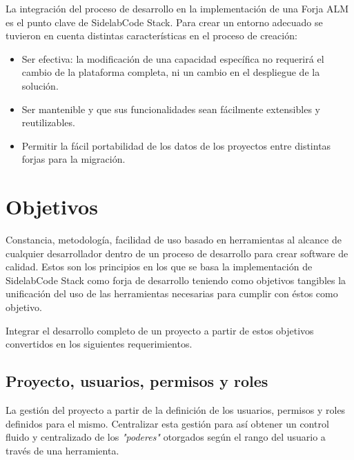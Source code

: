 \par La integraci\'on del proceso de desarrollo en la implementaci\'on de una Forja ALM es el punto clave de SidelabCode Stack. Para crear un entorno adecuado se tuvieron en cuenta distintas características en el proceso de creación:

\begin{itemize}
	\item Ser efectiva: la modificaci\'on de una capacidad espec\'ifica no requerir\'a el cambio de la plataforma completa, ni un cambio en el despliegue de la soluci\'on.
	\item Ser mantenible y que sus funcionalidades sean f\'acilmente extensibles y reutilizables.
	\item Permitir la f\'acil portabilidad de los datos de los proyectos entre distintas forjas para la migración.
\end{itemize}


\chapter{Objetivos}
\label{chap:objetivos}

\par Constancia, metodolog\'ia, facilidad de uso basado en herramientas al alcance de cualquier desarrollador dentro de un proceso de desarrollo para crear software de calidad. Estos son los principios en los que se basa la implementación de SidelabCode Stack como forja de desarrollo teniendo como objetivos tangibles la unificación del uso de las herramientas necesarias para cumplir con éstos como objetivo.

\par Integrar el desarrollo completo de un proyecto a partir de estos objetivos convertidos en los siguientes requerimientos.

\section{Proyecto, usuarios, permisos y roles }
\label{sec:proyecto-usuarios}

\par La gestión del proyecto a partir de la definición de los usuarios, permisos y roles definidos para el mismo. Centralizar esta gestión para así obtener un control fluido y centralizado de los \emph{"poderes"} otorgados según el rango del usuario a través de una herramienta.

